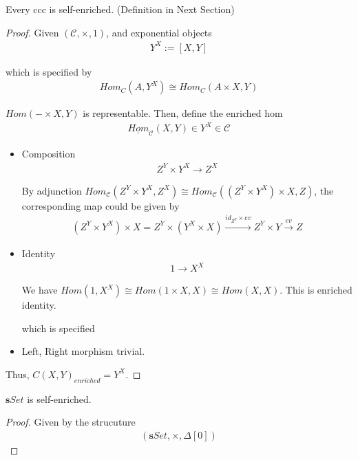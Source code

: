 \documentclass[Total.tex]{subfiles}
\begin{document}
			\begin{proposition}
				Every ccc is self-enriched. (Definition in Next Section)
			\end{proposition}
			\begin{proof}
				Given $(\mathcal{C},\times ,1)$, and exponential objects 
				\begin{gather*}
					Y^X:=[X,Y]
				\end{gather*}
				
				which is specified by
				\begin{gather*}
					Hom_C(A,Y^X)\cong Hom_C(A\times X,Y)
				\end{gather*}
				
				$Hom(-\times X,Y)$ is representable. Then, define the enriched hom
				\begin{gather*}
					\underline{Hom}_\mathcal{C}(X,Y)\in Y^X\in \mathcal{C}
				\end{gather*}
				
				\begin{itemize}
					\item Composition
					\begin{gather*}
						Z^Y\times Y^X\rightarrow Z^X
					\end{gather*}
					
					By adjunction $Hom_\mathcal{C}(Z^Y\times Y^X,Z^X)\cong Hom_\mathcal{C}((Z^Y\times Y^X)\times X,Z)$, the corresponding map could be given by
					\begin{gather*}
						(Z^Y\times Y^X)\times X=Z^Y\times (Y^X\times X)\stackrel{id_{Z^Y}\times ev}{\rightarrow} Z^Y\times Y\stackrel{ev}{\rightarrow} Z
					\end{gather*}
					\item Identity
					\begin{gather*}
						1\rightarrow X^X
					\end{gather*}
					
					We have $Hom(1,X^X)\cong Hom(1\times X,X)\cong Hom(X,X)$. This is enriched identity.
					
					which is specified 
					\item Left, Right morphism trivial.
				\end{itemize}
				
				Thus, $C(X,Y)_{enriched}=Y^X$.
			\end{proof}
			
			\begin{corollary}
				$\mathbf sSet$ is self-enriched.
			\end{corollary}
			\begin{proof}
				Given by the strucuture
				\begin{gather*}
					({\mathbf sSet},\times,\Delta[0])
				\end{gather*}
			\end{proof}
\end{document}
